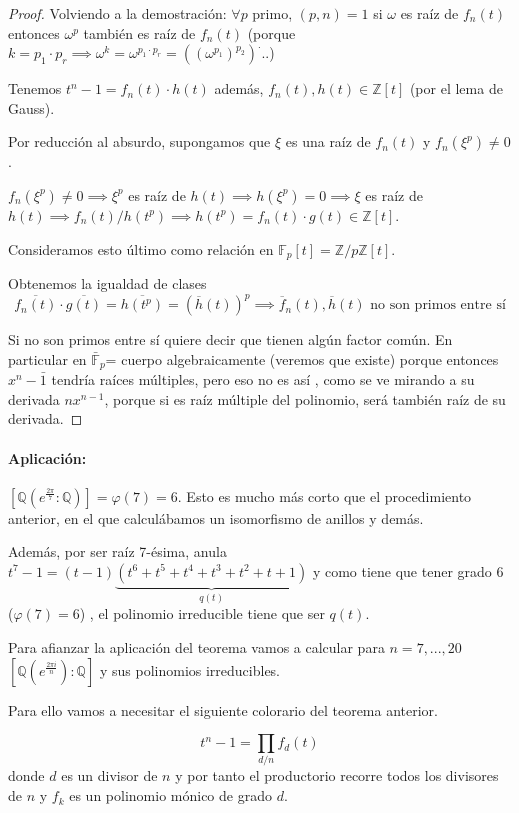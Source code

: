 \documentclass{apuntes}
\begin{document}
\begin{proof}
Volviendo a la demostración: $∀p$ primo, $(p,n)=1$ si $ω$ es raíz de $f_n(t)$ entonces $ω^p$ también es raíz de $f_n(t)$ (porque $k=p_1·p_r \implies ω^k = ω^{p_1·p_r} = \left((ω^{p_1})^{p_2}\right)^...$)


Tenemos $t^n - 1 = f_n(t)·h(t)$ además, $f_n(t),h(t) ∈ℤ[t]$ (por el lema de Gauss).

Por reducción al absurdo, supongamos que $ξ$ es una raíz de $f_n(t)$ y $f_n(ξ^p) ≠ 0$.

$f_n(ξ^p) ≠ 0 \implies ξ^p$ es raíz de $h(t) \implies h(ξ^p) = 0 \implies ξ$ es raíz de $h(t) \implies f_n(t)/h(t^p) \implies h(t^p) = f_n(t)·g(t) ∈ℤ[t]$.


Consideramos esto último como relación en $\mathbb{F}_p[t] = ℤ/pℤ[t]$.

Obtenemos la igualdad de clases $$\overline{f_n(t)} · \overline{g(t)} = \overline{h(t^p)} = \left(\overline{h}(t)\right)^p \implies \overline{f}_n(t),\overline{h}(t) \text{ no son primos entre sí}$$

Si no son primos entre sí quiere decir que tienen algún factor común. En particular en $\bar{\mathbb{F}}_p$= cuerpo algebraicamente  (veremos que existe) porque entonces $x^n-\bar{1}$ tendría raíces múltiples, pero eso no es así , como se ve mirando a su derivada $nx^{n-1}$, porque si es raíz múltiple del polinomio, será también raíz de su derivada.
\end{proof}

\paragraph{Aplicación:} $[ℚ(e^{\frac{2π}{7}} : ℚ)] = φ(7) = 6$. Esto es mucho más corto que el procedimiento anterior, en el que calculábamos un isomorfismo de anillos y demás.

Además, por ser raíz 7-ésima, anula $t^7-1 = (t-1)\underbrace{(t^6 + t^5 + t^4 + t^3 + t^2 + t + 1)}_{q(t)}$ y como tiene que tener grado 6 ($φ(7) = 6$) , el polinomio irreducible tiene que ser $q(t)$.

Para afianzar la aplicación del teorema vamos a calcular para $n=7,...,20$ \\
$[ℚ(e^{\frac{2πi}{n}}):ℚ]$ y sus polinomios irreducibles.

Para ello vamos a necesitar el siguiente colorario del teorema anterior.

\begin{corol}
$$t^n-1 = \prod_{d/n}f_d(t)$$ donde $d$ es un divisor de $n$ y por tanto el productorio recorre todos los divisores de $n$ y $f_k$ es un polinomio mónico de grado $d$.
\end{corol}
\end{document}
